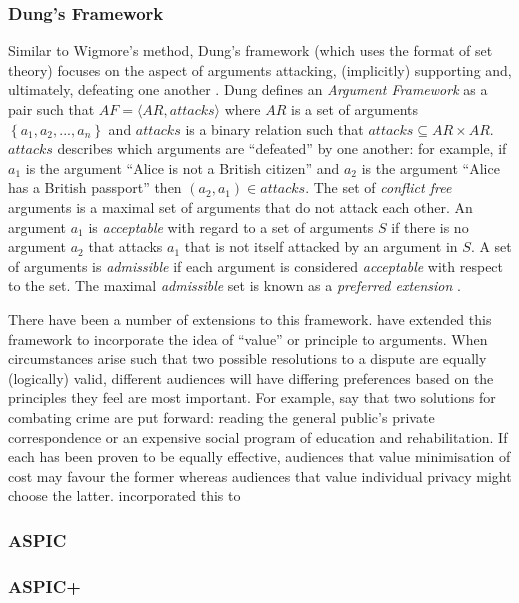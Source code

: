 \subsubsection{Dung's Framework}
Similar to Wigmore's method, Dung's framework (which uses the format of set theory) focuses on the aspect of arguments attacking, (implicitly) supporting and, ultimately, defeating one another \citep{Dung1995}. Dung defines an \textit{Argument Framework} as a pair such that $AF = \langle AR, attacks \rangle$ where $AR$ is a set of arguments $\left\{a_1, a_2, ..., a_n\right\}$ and $attacks$ is a binary relation such that $attacks \subseteq AR \times AR$. $attacks$ describes which arguments are ``defeated'' by one another: for example, if $a_1$ is the argument ``Alice is not a British citizen'' and $a_2$ is the argument ``Alice has a British passport'' then $(a_2, a_1) \in attacks$. The set of \textit{conflict free} arguments is a maximal set of arguments that do not attack each other. An argument $a_1$ is \textit{acceptable} with regard to a set of arguments $S$ if there is no argument $a_2$ that attacks $a_1$ that is not itself attacked by an argument in $S$. A set of arguments is \textit{admissible} if each argument is considered \textit{acceptable} with respect to the set. The maximal \textit{admissible} set is known as a \textit{preferred extension} \citep{Schneider2013}. 

There have been a number of extensions to this framework.
\citet{Bench-Capon2002} have extended this framework to incorporate the idea of ``value'' or principle to arguments. When circumstances arise such that two possible resolutions to a dispute are equally (logically) valid, different audiences will have differing preferences based on the principles they feel are most important. For example, say that two solutions for combating crime are put forward: reading the general public's private correspondence or an expensive social program of education and rehabilitation. If each has been proven to be equally effective, audiences that value minimisation of cost may favour the former whereas audiences that value individual privacy might choose the latter.
\citet{dunne2016heard} incorporated this to 


\subsubsection{ASPIC}

\subsubsection{ASPIC+}

